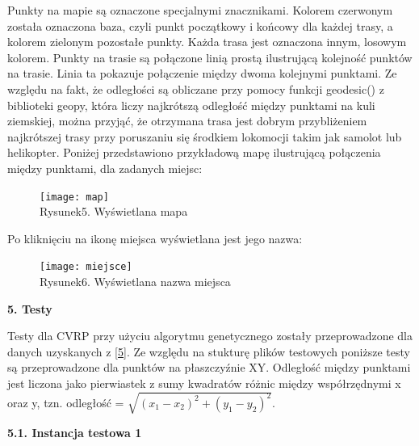 \documentclass[a4paper, twoside, 12pt, justified]{article}
\begin{document}
	Punkty na mapie są oznaczone specjalnymi znacznikami. Kolorem czerwonym została oznaczona baza, czyli punkt początkowy i końcowy dla każdej trasy, a kolorem zielonym pozostałe punkty. Każda trasa jest oznaczona innym, losowym kolorem. Punkty na trasie są połączone linią prostą ilustrującą kolejność punktów na trasie. Linia ta pokazuje połączenie między dwoma kolejnymi punktami. Ze względu na fakt, że odległości są obliczane przy pomocy funkcji geodesic() z biblioteki geopy, która liczy najkrótszą odległość między punktami na kuli ziemskiej, można przyjąć, że otrzymana trasa jest dobrym przybliżeniem najkrótszej trasy przy poruszaniu się środkiem lokomocji takim jak samolot lub helikopter.
	Poniżej przedstawiono przykładową mapę ilustrującą połączenia między punktami, dla zadanych miejsc:
	
	\newpage
	\begin{figure}[h]
		\texttt{[image: map]}
		\centering
		\\
		{Rysunek5. Wyświetlana mapa}
	\end{figure}
	
	Po kliknięciu na ikonę miejsca wyświetlana jest jego nazwa:
	
	\newpage
	
	\begin{figure}[h]
		\texttt{[image: miejsce]}
		\centering
		\\
		{Rysunek6. Wyświetlana nazwa miejsca}
	\end{figure}
	
	
	\newpage
	\begin{flushleft}
		\begin{LARGE}
			\textbf{5. Testy}
		\end{LARGE}
	\end{flushleft}

	Testy dla CVRP przy użyciu algorytmu genetycznego zostały przeprowadzone dla danych uzyskanych z \hyperlink{tests}{[5]}. Ze względu na stukturę plików testowych poniższe testy są przeprowadzone dla punktów na płaszczyźnie XY. Odległość między punktami jest liczona jako pierwiastek z sumy kwadratów różnic między współrzędnymi x oraz y, tzn. odległość = $\sqrt{(x_1-x_2)^2 + (y_1-y_2)^2}$.
	
	\begin{flushleft}
		\begin{large}
			\textbf{5.1. Instancja testowa 1}
		\end{large}
	\end{flushleft}
	\vspace{10mm} %
	
\end{document}
